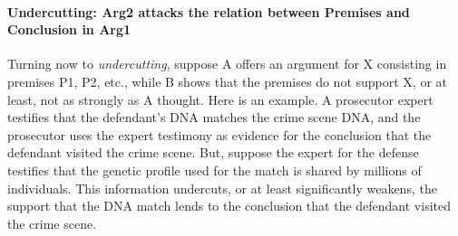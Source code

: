 \documentclass[10pt]{article}
\begin{document}

\paragraph{Undercutting: Arg2 attacks the relation between Premises and Conclusion in Arg1}

Turning now to \textit{undercutting}, suppose A offers an argument for X consisting in premises 
P1, P2, etc., while B shows that the premises do not support X, or at least, not as strongly as A thought. 
 Here is  an example. A prosecutor expert testifies that the defendant's 
 DNA matches the crime scene DNA, and the prosecutor uses the expert testimony as evidence 
 for the conclusion that the defendant visited the crime scene. But, suppose the expert for the defense 
 testifies that the genetic profile used for the match is shared by millions of individuals. This information undercuts, or at least significantly 
 weakens, the support that the DNA match lends to the conclusion that the defendant visited the crime scene. 
\end{document}
